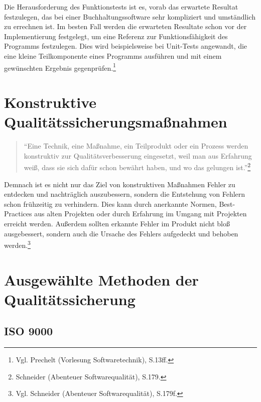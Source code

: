             Die Herausforderung des Funktionstests ist es, vorab das erwartete Resultat festzulegen, das bei einer Buchhaltungssoftware sehr kompliziert und umständlich zu errechnen ist. Im besten Fall werden die erwarteten Resultate schon vor der Implementierung festgelegt, um eine Referenz zur Funktionsfähigkeit des Programms festzulegen. Dies wird beispielsweise bei Unit-Tests angewandt, die eine kleine Teilkomponente eines Programms ausführen und mit einem gewünschten Ergebnis gegenprüfen.\footnote{Vgl. Prechelt (Vorlesung Softwaretechnik), S.13ff.}

%
%
    \section{Konstruktive Qualitätssicherungsmaßnahmen}

         \begin{quote}
                \enquote{Eine Technik, eine Maßnahme, ein Teilprodukt oder ein Prozess werden konstruktiv zur Qualitätsverbesserung eingesetzt, weil man aus Erfahrung weiß, dass sie sich dafür schon bewährt haben, und wo das gelungen ist.}\footnote{Schneider (Abenteuer Softwarequalität), S.179.}
            \end{quote}

            Demnach ist es nicht nur das Ziel von konstruktiven Maßnahmen Fehler zu entdecken und nachträglich auszubessern, sondern die Entstehung von Fehlern schon frühzeitig zu verhindern. Dies kann durch anerkannte Normen, Best-Practices aus alten Projekten oder durch Erfahrung im Umgang mit Projekten erreicht werden. Außerdem sollten erkannte Fehler im Produkt nicht bloß ausgebessert, sondern auch die Ursache des Fehlers aufgedeckt und behoben werden.\footnote{Vgl. Schneider (Abenteuer Softwarequalität), S.179f.}

%
%
    \section{Ausgewählte Methoden der Qualitätssicherung}
    \label{sec:qsmethoden}

        \subsection{ISO 9000}
        \label{subsec:iso9000}

